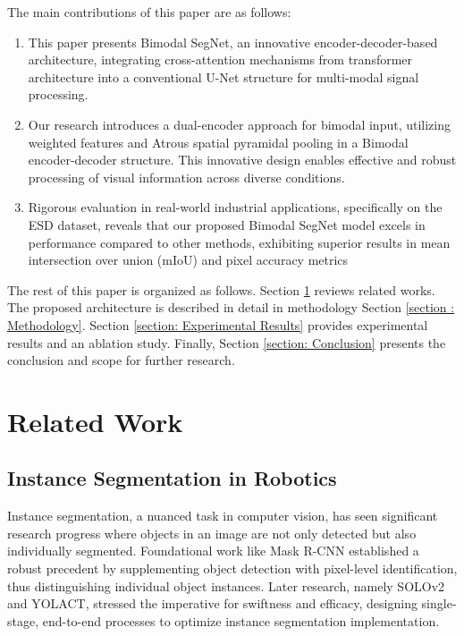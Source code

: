 \documentclass[lettersize,journal]{IEEEtran}
\begin{document}
The main contributions of this paper are as follows:
\begin{enumerate}






\item This paper presents Bimodal SegNet, an innovative encoder-decoder-based architecture, integrating cross-attention mechanisms from transformer architecture into a conventional U-Net structure for multi-modal signal processing.

\item Our research introduces a dual-encoder approach for bimodal input, utilizing weighted features and Atrous spatial pyramidal pooling in a Bimodal encoder-decoder structure. This innovative design enables effective and robust processing of visual information across diverse conditions.

\item  Rigorous evaluation in real-world industrial applications, specifically on the ESD dataset, reveals that our proposed Bimodal SegNet model excels in performance compared to other methods, exhibiting superior results in mean intersection over union (mIoU) and pixel accuracy metrics


    
 \end{enumerate} 




The rest of this paper is organized as follows. Section \ref{section : Related Work} reviews related works. The proposed architecture is described in detail in methodology Section \ref{section : Methodology}. Section \ref{section: Experimental Results} provides experimental results and an ablation study. Finally, Section \ref{section: Conclusion} presents the conclusion and scope for further research. 








\section{{Related Work}}
\label{section : Related Work}


\subsection{\textbf{Instance Segmentation in Robotics}}
Instance segmentation, a nuanced task in computer vision, has seen significant research progress where objects in an image are not only detected but also individually segmented. Foundational work like Mask R-CNN \cite{He2017MaskR-CNN} established a robust precedent by supplementing object detection with pixel-level identification, thus distinguishing individual object instances. Later research, namely SOLOv2\cite{Wang2020SOLOv2:Segmentation} and YOLACT\cite{Bolya2019YOLACTSegmentation}, stressed the imperative for swiftness and efficacy, designing single-stage, end-to-end processes to optimize instance segmentation implementation.
\end{document}
